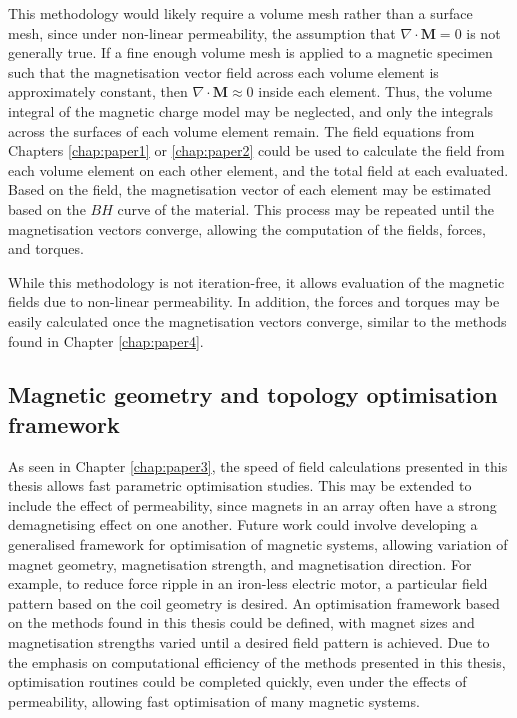 This methodology would likely require a volume mesh rather than a surface mesh, since under non-linear permeability, the assumption that \(\nabla \cdot \mathbf{M} = 0\) is not generally true. If a fine enough volume mesh is applied to a magnetic specimen such that the magnetisation vector field across each volume element is approximately constant, then \(\nabla \cdot \mathbf{M} \approx 0\) inside each element. Thus, the volume integral of the magnetic charge model may be neglected, and only the integrals across the surfaces of each volume element remain. The field equations from Chapters \ref{chap:paper1} or \ref{chap:paper2} could be used to calculate the field from each volume element on each other element, and the total field at each evaluated. Based on the field, the magnetisation vector of each element may be estimated based on the \(BH\) curve of the material. This process may be repeated until the magnetisation vectors converge, allowing the computation of the fields, forces, and torques.

While this methodology is not iteration-free, it allows evaluation of the magnetic fields due to non-linear permeability. In addition, the forces and torques may be easily calculated once the magnetisation vectors converge, similar to the methods found in Chapter \ref{chap:paper4}.

\subsection{Magnetic geometry and topology optimisation framework}
As seen in Chapter \ref{chap:paper3}, the speed of field calculations presented in this thesis allows fast parametric optimisation studies. This may be extended to include the effect of permeability, since magnets in an array often have a strong demagnetising effect on one another. Future work could involve developing a generalised framework for optimisation of magnetic systems, allowing variation of magnet geometry, magnetisation strength, and magnetisation direction. For example, to reduce force ripple in an iron-less electric motor, a particular field pattern based on the coil geometry is desired. An optimisation framework based on the methods found in this thesis could be defined, with magnet sizes and magnetisation strengths varied until a desired field pattern is achieved. Due to the emphasis on computational efficiency of the methods presented in this thesis, optimisation routines could be completed quickly, even under the effects of permeability, allowing fast optimisation of many magnetic systems.

